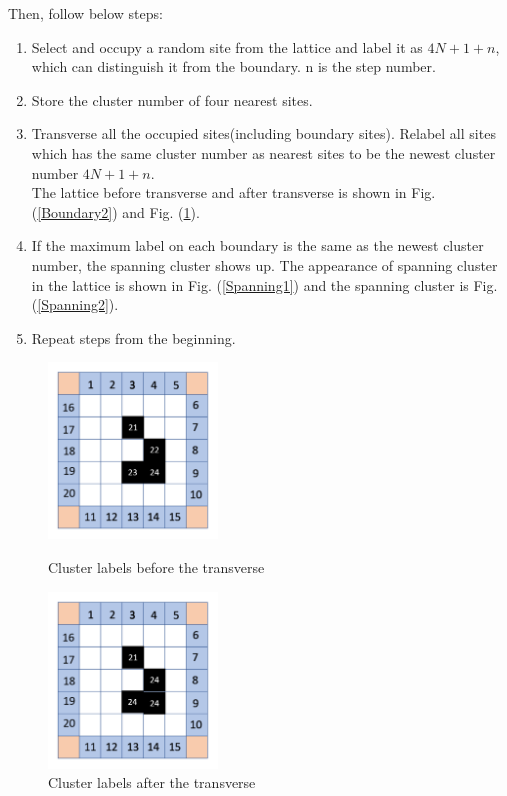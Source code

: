 \documentclass[12pt]{article}
\begin{document}
Then, follow below steps: 
\begin{enumerate}
  \item Select and occupy a random site from the lattice and label it as $4N+1+n$, which can distinguish it from the boundary. n is the step number. 
  \item Store the cluster number of four nearest sites. 
  \item Transverse all the occupied sites(including boundary sites). Relabel all sites which has the same cluster number as nearest sites to be the newest cluster number $4N+1+n$. \\
        The lattice before transverse and after transverse is shown in Fig. (\ref{Boundary2}) and Fig. (\ref{Boundary3}). 
  \item If the maximum label on each boundary is the same as the newest cluster number, the spanning cluster shows up. The appearance of spanning cluster in the lattice is shown in Fig. (\ref{Spanning1}) and the spanning cluster is Fig. (\ref{Spanning2}). 
  \item Repeat steps from the beginning. 
\end{enumerate}
\begin{figure}[h]
\centering
\includegraphics[width=0.4\textwidth]{Boundary2}
\caption{Cluster labels before the transverse}
\label{Boundary2}
\includegraphics[width=0.4\textwidth]{Boundary3}
\caption{Cluster labels after the transverse}
\label{Boundary3}
\end{figure}
\end{document}

